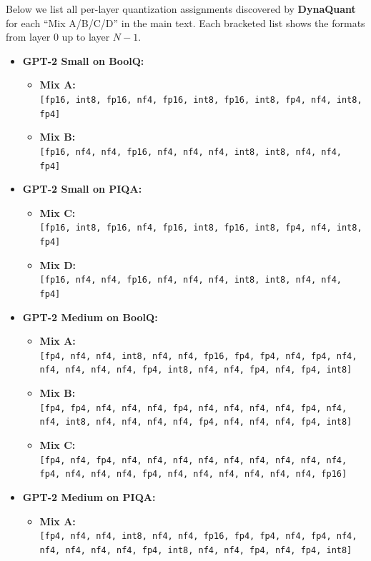 \documentclass{article}
\begin{document}
	{\small %
		
		Below we list all per-layer quantization assignments discovered by \textbf{DynaQuant} 
		for each “Mix A/B/C/D” in the main text. Each bracketed list shows
		the formats from layer 0 up to layer \(N-1\).
		
		\begin{itemize}
			\item \textbf{GPT-2 Small on BoolQ:}
			\begin{itemize}
				\item \textbf{Mix A:}\\
				\texttt{[fp16, int8, fp16, nf4, fp16, int8, fp16, int8, fp4, nf4, int8, fp4]}
				
				\item \textbf{Mix B:}\\
				\texttt{[fp16, nf4, nf4, fp16, nf4, nf4, nf4, int8, int8, nf4, nf4, fp4]}
			\end{itemize}
			\item \textbf{GPT-2 Small on PIQA:}
			\begin{itemize}
				\item \textbf{Mix C:}\\
				\texttt{[fp16, int8, fp16, nf4, fp16, int8, fp16, int8, fp4, nf4, int8, fp4]}
				
				\item \textbf{Mix D:}\\
				\texttt{[fp16, nf4, nf4, fp16, nf4, nf4, nf4, int8, int8, nf4, nf4, fp4]}
			\end{itemize}
			\item \textbf{GPT-2 Medium on BoolQ:}
			\begin{itemize}
				\item \textbf{Mix A:}\\
				\texttt{[fp4, nf4, nf4, int8, nf4, nf4, fp16, fp4, fp4, nf4, fp4, nf4, nf4, nf4, nf4, nf4, fp4, int8, nf4, nf4, fp4, nf4, fp4, int8]}
				
				\item \textbf{Mix B:}\\
				\texttt{[fp4, fp4, nf4, nf4, nf4, fp4, nf4, nf4, nf4, nf4, fp4, nf4, nf4, int8, nf4, nf4, nf4, nf4, fp4, nf4, nf4, nf4, fp4, int8]}
				
				\item \textbf{Mix C:}\\
				\texttt{[fp4, nf4, fp4, nf4, nf4, nf4, nf4, nf4, nf4, nf4, nf4, nf4, fp4, nf4, nf4, nf4, fp4, nf4, nf4, nf4, nf4, nf4, nf4, fp16]}
			\end{itemize}
			\item \textbf{GPT-2 Medium on PIQA:}
			\begin{itemize}
				\item \textbf{Mix A:}\\
				\texttt{[fp4, nf4, nf4, int8, nf4, nf4, fp16, fp4, fp4, nf4, fp4, nf4, nf4, nf4, nf4, nf4, fp4, int8, nf4, nf4, fp4, nf4, fp4, int8]}
				

\end{itemize}
\end{itemize}}
\end{document}
